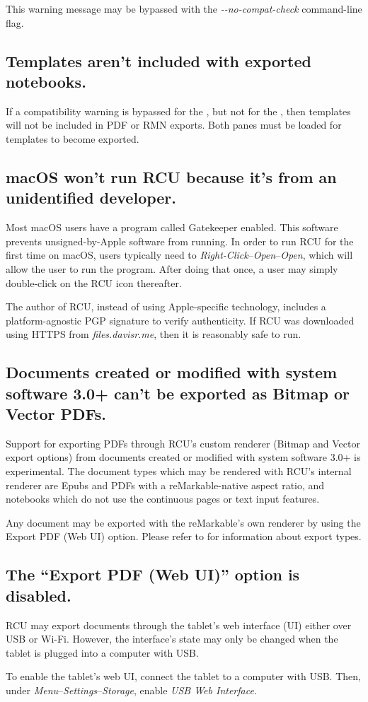 This warning message may be bypassed with the \textit{\--\--no-compat-check} command-line flag.

\subsection{Templates aren't included with exported notebooks.}
If a compatibility warning is bypassed for the , but not for the , then templates will not be included in PDF or RMN exports. Both panes must be loaded for templates to become exported.

\subsection{macOS won't run RCU because it's from an unidentified developer.}
\label{sec:macosgatekeeper}
Most macOS users have a program called Gatekeeper enabled. This software prevents unsigned-by-Apple software from running. In order to run RCU for the first time on macOS, users typically need to \textit{Right-Click}--\textit{Open}--\textit{Open}, which will allow the user to run the program. After doing that once, a user may simply double-click on the RCU icon thereafter.

The author of RCU, instead of using Apple-specific technology, includes a platform-agnostic PGP signature to verify authenticity. If RCU was downloaded using HTTPS from \textit{files.davisr.me}, then it is reasonably safe to run.


\subsection{Documents created or modified with system software 3.0+ can't be exported as Bitmap or Vector PDFs.}
Support for exporting PDFs through RCU's custom renderer (Bitmap and Vector export options) from documents created or modified with system software 3.0+ is experimental. The document types which may be rendered with RCU's internal renderer are Epubs and PDFs with a reMarkable-native aspect ratio, and notebooks which do not use the continuous pages or text input features.

Any document may be exported with the reMarkable's own renderer by using the Export PDF (Web UI) option. Please refer to  for information about export types.


\subsection{The ``Export PDF (Web UI)'' option is disabled.}
RCU may export documents through the tablet's web interface (UI) either over USB or Wi-Fi. However, the interface's state may only be changed when the tablet is plugged into a computer with USB.

To enable the tablet's web UI, connect the tablet to a computer with USB. Then, under \textit{Menu}--\textit{Settings}--\textit{Storage}, enable \textit{USB Web Interface}.
